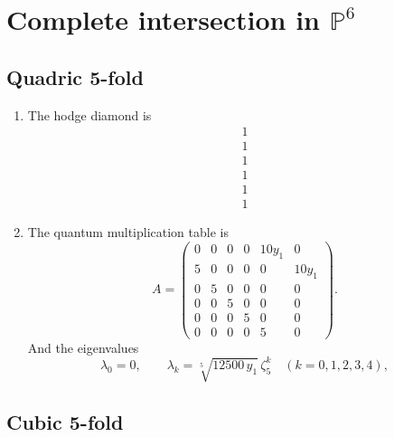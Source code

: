 \documentclass[11pt]{amsart}
\newcounter{num}[section] %
\begin{document}
\section{Complete intersection in $\mathbb{P}^6$}

\subsection{Quadric 5-fold}

\begin{enumerate}
    \item [1)]The hodge diamond is
    \[
        \begin{array}{c}
            1   \\
             1\\
             1\\
             1\\
             1\\
             1
        \end{array}
    \]

    \item[2)] The quantum multiplication table is
    \[
A=
\begin{pmatrix}
0 & 0 & 0 & 0 & 10y_1 & 0 \\
5 & 0 & 0 & 0 & 0 & 10y_1 \\
0 & 5 & 0 & 0 & 0 & 0 \\
0 & 0 & 5 & 0 & 0 & 0 \\
0 & 0 & 0 & 5 & 0 & 0 \\
0 & 0 & 0 & 0 & 5 & 0
\end{pmatrix}.
\]
And the eigenvalues
\[
\lambda_0=0,
\qquad
\lambda_k=\sqrt[5]{12500\,y_1}\,\zeta_5^k
\quad (k=0,1,2,3,4),
\]
\end{enumerate}

\subsection{Cubic 5-fold}
\end{document}
